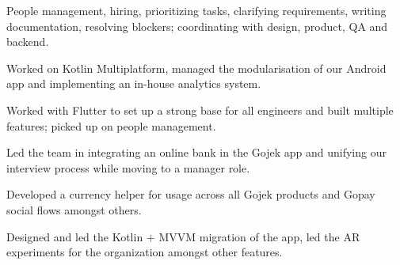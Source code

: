 \documentclass[]{deedy-resume-reversed}
\begin{document}
\begin{minipage}[t]{0.60\textwidth}

\textbullet{}
\begin{tightemize}
\item People management, hiring, prioritizing tasks, clarifying requirements, writing documentation, resolving blockers; coordinating with design, product, QA and backend.
\item Worked on Kotlin Multiplatform, managed the modularisation of our Android app and implementing an in-house analytics system.
\end{tightemize}

\textbullet{}
\begin{tightemize}
\item Worked with Flutter to set up a strong base for all engineers and built multiple features; picked up on people management.
\end{tightemize}

\textbullet{}
\begin{tightemize}
\item Led the team in integrating an online bank in the Gojek app and unifying our interview process while moving to a manager role.
\end{tightemize}

\textbullet{}
\begin{tightemize}
\item Developed a currency helper for usage across all Gojek products and Gopay social flows amongst others.
\end{tightemize}
\sectionsep


\textbullet{}
\begin{tightemize}
\item Designed and led the Kotlin + MVVM migration of the app, led the AR experiments for the organization amongst other features.
\end{tightemize}
\sectionsep


\end{minipage}
\end{document}
